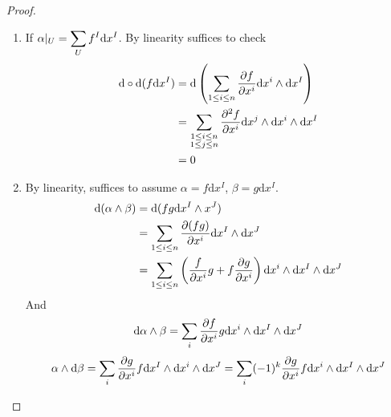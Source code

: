 \begin{proof}
    \,
    \begin{enumerate}[label=(\arabic*)]
        \item If  $ \alpha|_U=\displaystyle\sum_{U}f^I\mathrm{d}x^I $. By linearity suffices to  check
        \begin{equation*}
            \begin{aligned}
                \mathrm{d}\circ \mathrm{d}(f\mathrm{d}x^I)&=\mathrm{d}\left(\displaystyle\sum_{1 \leq i \leq n}\frac{\partial f}{\partial x^i}\mathrm{d}x^i\wedge\mathrm{d}x^I\right)\\
                &=\displaystyle\sum_{\substack{1 \leq i \leq n\\1 \leq j \leq n}}\displaystyle\frac{\partial ^2 f}{\partial x^i}\mathrm{d}x^j\wedge\mathrm{d}x^i\wedge\mathrm{d}x^I\\
                &=0
            \end{aligned}
        \end{equation*}
        \item By linearity, suffices to assume  $ \alpha=f\mathrm{d}x^I $,  $ \beta=g\mathrm{d}x^I $.
        \begin{equation*}
            \begin{aligned}
                \mathrm{d}(\alpha\wedge\beta)&=\displaystyle \mathrm{d}(fg\mathrm{d}x^I\wedge x^J)\\
                &=\displaystyle\sum_{1 \leq i \leq n}\frac{\partial(fg)}{\partial x^i}\mathrm{d}x^I\wedge\mathrm{d}x^J\\
                &=\displaystyle\sum_{1 \leq i \leq n}\left(\frac{f}{\partial x^i}g+f\frac{\partial g}{\partial x^i} \right)\mathrm{d}x^i\wedge\mathrm{d}x^I\wedge\mathrm{d}x^J
            \end{aligned}
        \end{equation*}
        And
        \begin{equation*}
            \mathrm{d}\alpha\wedge\beta=\displaystyle\sum_i\frac{\partial f}{\partial x^i}g\mathrm{d}x^i\wedge\mathrm{d}x^I\wedge\mathrm{d}x^J
        \end{equation*}
        \begin{equation*}
            \alpha\wedge\mathrm{d}\beta=\displaystyle\sum_i\frac{\partial g}{\partial x^i}f\mathrm{d}x^I\wedge \mathrm{d}x^i\wedge\mathrm{d}x^J=\displaystyle\sum_i (-1)^k \frac{\partial g}{\partial x^i}f\mathrm{d}x^i\wedge\mathrm{d}x^I\wedge\mathrm{d}x^J
        \end{equation*}
    \end{enumerate}
\end{proof}
